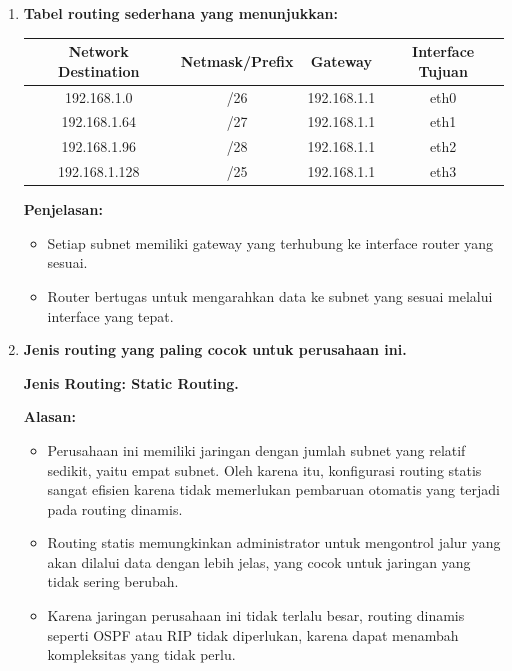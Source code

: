 \begin{enumerate}
	\item \textbf{Tabel routing sederhana yang menunjukkan:}
	\begin{center}
		\begin{tabular}{|c|c|c|c|}
			\hline
			\textbf{Network Destination} & \textbf{Netmask/Prefix} & \textbf{Gateway} & \textbf{Interface Tujuan} \\
			\hline
			192.168.1.0 & /26 & 192.168.1.1 & eth0 \\
			192.168.1.64 & /27 & 192.168.1.1 & eth1 \\
			192.168.1.96 & /28 & 192.168.1.1 & eth2 \\
			192.168.1.128 & /25 & 192.168.1.1 & eth3 \\
			\hline
		\end{tabular}
	\end{center}
	\textbf{Penjelasan:} 
	\begin{itemize}
		\item Setiap subnet memiliki gateway yang terhubung ke interface router yang sesuai.
		\item Router bertugas untuk mengarahkan data ke subnet yang sesuai melalui interface yang tepat.
	\end{itemize}

	\item \textbf{Jenis routing yang paling cocok untuk perusahaan ini.}

	\textbf{Jenis Routing: Static Routing.}

	\textbf{Alasan:}
	\begin{itemize}
		\item Perusahaan ini memiliki jaringan dengan jumlah subnet yang relatif sedikit, yaitu empat subnet. Oleh karena itu, konfigurasi routing statis sangat efisien karena tidak memerlukan pembaruan otomatis yang terjadi pada routing dinamis.
		\item Routing statis memungkinkan administrator untuk mengontrol jalur yang akan dilalui data dengan lebih jelas, yang cocok untuk jaringan yang tidak sering berubah.
		\item Karena jaringan perusahaan ini tidak terlalu besar, routing dinamis seperti OSPF atau RIP tidak diperlukan, karena dapat menambah kompleksitas yang tidak perlu.
	\end{itemize}
\end{enumerate}
